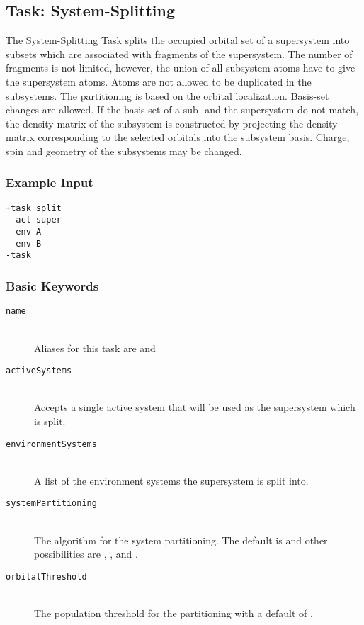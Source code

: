 \subsection{Task: System-Splitting}
The System-Splitting Task splits the occupied orbital set of a supersystem into subsets which are associated with fragments of the supersystem. The number of fragments is not limited, however, the union of all subsystem atoms have to give the supersystem atoms. Atoms are not allowed to be duplicated in the subsystems. The partitioning is based on the orbital localization. Basis-set changes are allowed. If the basis set of a sub- and the supersystem do not match, the density matrix of the subsystem is constructed by projecting the density matrix corresponding to the selected orbitals into the subsystem basis. Charge, spin and geometry of
the subsystems may be changed.
\subsubsection{Example Input}
\begin{lstlisting}
+task split
  act super
  env A
  env B
-task
\end{lstlisting}
\subsubsection{Basic Keywords}
\begin{description}
	\item[\texttt{name}]\hfill \\
	Aliases for this task are  and 
	\item[\texttt{activeSystems}]\hfill \\
	Accepts a single active system that will be used as the supersystem which is split.
	\item[\texttt{environmentSystems}]\hfill \\
	A list of the environment systems the supersystem is split into.
	\item[\texttt{systemPartitioning}]\hfill \\
	The algorithm for the system partitioning. The default is  and other possibilities are , ,  and  .
	\item[\texttt{orbitalThreshold}]\hfill \\
	The population threshold for the  partitioning with a default of .
\end{description}

